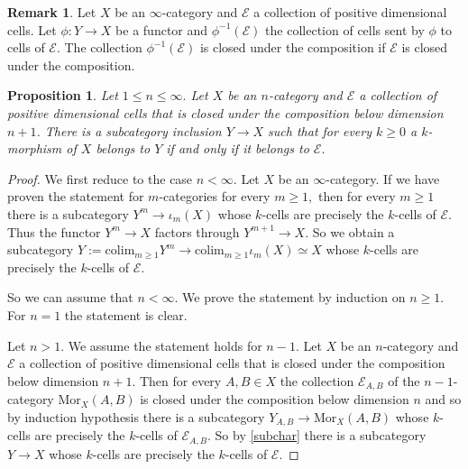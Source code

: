\documentclass[10pt,oneside]{article}
\numberwithin{equation}{section} %
\numberwithin{figure}{section} %
\theoremstyle{plain}
\newtheorem{proposition}[theorem]{Proposition}
\theoremstyle{definition}
\newtheorem{remark}[theorem]{Remark}
\newcommand{\mE}{{\mathcal E}}
\newcommand{\colim}{\mathrm{colim}}
\newcommand{\Mor}{{\mathrm{Mor}}}
\begin{document}
\begin{remark}\label{premark}
Let $X$ be an $\infty$-category and $\mE$ a collection of positive dimensional cells. Let $\phi: Y \to X$ be a functor and $\phi^{-1}(\mE)$ the collection of cells sent by $\phi$ to cells of $\mE.$ The collection $\phi^{-1}(\mE)$ is closed under the composition if $\mE$ is closed under the composition.
    
\end{remark}

\begin{proposition}\label{subcarz}
Let $1 \leq n \leq \infty. $
Let $X$ be an $n$-category and $\mE$ a collection of positive dimensional cells that is closed under the composition below dimension $n+1$.
There is a subcategory inclusion $Y \to X$ such that for every
$k \geq 0$ a $k$-morphism of $X$ belongs to $Y$ if and only if 
it belongs to $\mE.$
    
\end{proposition}

\begin{proof}

We first reduce to the case $n < \infty.$
Let $X$ be an $\infty$-category. If we have proven the statement for $m$-categories for every $m \geq 1,$ then for every $m \geq 1$ there is a subcategory $Y^m \to \iota_m(X)$ whose $k$-cells are precisely the $k$-cells of $\mE.$
Thus the functor $Y^m \to X $ factors through $Y^{m+1} \to X.$
So we obtain a subcategory $Y:= \colim_{m \geq 1} Y^m \to \colim_{m \geq 1} \iota_m(X) \simeq X $ whose $k$-cells are precisely the $k$-cells of $\mE.$

So we can assume that $n < \infty.$
We prove the statement by induction on $n \geq 1$.
For $n=1$ the statement is clear.

Let $n > 1$. We assume the statement holds for $n-1$.
Let $X$ be an $n$-category and $\mE$ a collection of positive dimensional cells that is closed under the composition below dimension $n+1$.
Then for every $A,B \in X$ the collection
$\mE_{A,B} $ of the $n-1$-category $ \Mor_X(A,B) $ is closed under the composition below dimension $n$ and so by induction hypothesis there is a subcategory 
$Y_{A,B} \to \Mor_X(A,B)$ whose $k$-cells are precisely the $k$-cells of 
$\mE_{A,B} $. So by \cref{subchar} there is a subcategory $Y \to X$
whose $k$-cells are precisely the $k$-cells of $\mE.$
\end{proof}
\end{document}
